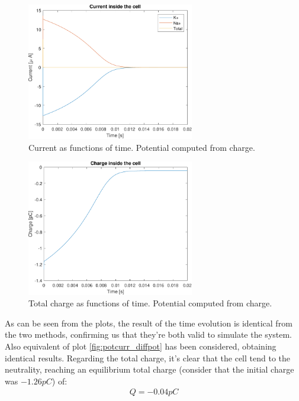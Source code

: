 \documentclass[11pt,a4 paper]{article}
\begin{document}
\begin{figure}[H]
    \centering
    \includegraphics[width=0.65\textwidth]{current_chargepot.pdf}
    \caption{Current as functions of time. Potential computed from charge.}
    \label{fig:current_chargepot}
\end{figure}

\begin{figure}[H]
    \centering
    \includegraphics[width=0.65\textwidth]{charge_chargepot.pdf}
    \caption{Total charge as functions of time. Potential computed from charge.}
    \label{fig:charge_chargepot}
\end{figure}

As can be seen from the plots, the result of the time evolution is identical from the two methods, confirming us that they're both valid to simulate the system. Also equivalent of plot \ref{fig:potcurr_diffpot} has been considered, obtaining identical results. Regarding the total charge, it's clear that the cell tend to the neutrality, reaching an equilibrium total charge (consider that the initial charge was $-1.26\si{pC}$) of:
\begin{align*}
    Q = -0.04 \si{pC}
\end{align*}
\end{document}
